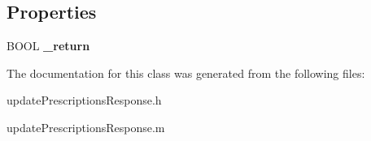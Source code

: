 \subsection*{Properties}
\begin{DoxyCompactItemize}
\item 
\hypertarget{interfaceupdate_prescriptions_response_a8f01023a6e5116f9fb801295b5a1349e}{}B\+O\+O\+L {\bfseries \+\_\+return}\label{interfaceupdate_prescriptions_response_a8f01023a6e5116f9fb801295b5a1349e}

\end{DoxyCompactItemize}


The documentation for this class was generated from the following files\+:\begin{DoxyCompactItemize}
\item 
update\+Prescriptions\+Response.\+h\item 
update\+Prescriptions\+Response.\+m\end{DoxyCompactItemize}
